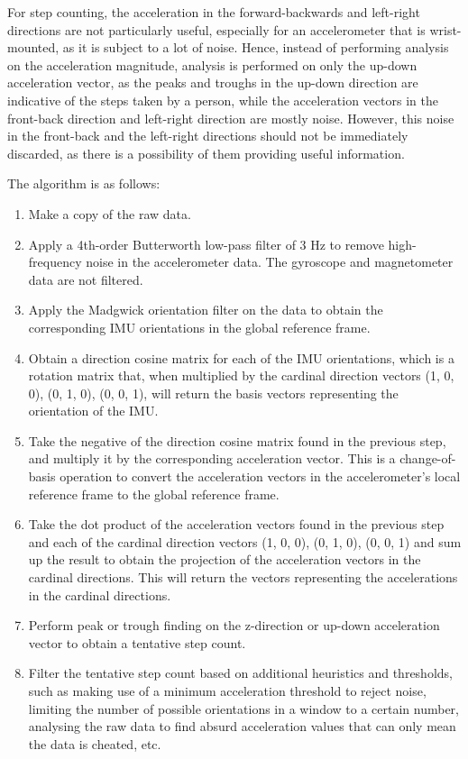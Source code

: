 \documentclass[12pt]{report}
\begin{document}
For step counting, the acceleration in the forward-backwards and left-right
directions are not particularly useful, especially for an accelerometer
that is wrist-mounted, as it is subject to a lot of noise.
Hence, instead of performing analysis on the acceleration
magnitude, analysis is performed on only the up-down acceleration vector,
as the peaks and troughs in the up-down direction are indicative of
the steps taken by a person, while the acceleration vectors in the
front-back direction and left-right direction are mostly noise.
However, this noise in the front-back and the left-right directions
should not be immediately discarded, as there is a possibility
of them providing useful information.

\clearpage

The algorithm is as follows:
\begin{enumerate}
\item Make a copy of the raw data.
\item Apply a 4th-order Butterworth low-pass filter of 3 Hz
to remove high-frequency noise in the accelerometer data.
The gyroscope and magnetometer data are not filtered.
\item Apply the Madgwick orientation filter on the data to obtain
the corresponding IMU orientations in the global reference frame.
\item Obtain a direction cosine matrix for each of the IMU orientations,
which is a rotation matrix that, when multiplied by the cardinal
direction vectors (1, 0, 0), (0, 1, 0), (0, 0, 1), will return
the basis vectors representing the orientation of the IMU.
\item Take the negative of the direction cosine matrix found in the
previous step, and multiply it by the corresponding
acceleration vector. This is a change-of-basis operation to
convert the acceleration vectors in the accelerometer's local
reference frame to the global reference frame.
\item Take the dot product of the acceleration vectors found in the previous
step and each of the cardinal direction vectors
(1, 0, 0), (0, 1, 0), (0, 0, 1) and sum up the result
to obtain the projection of the acceleration vectors
in the cardinal directions. This will return the vectors
representing the accelerations in the cardinal directions.
\item Perform peak or trough finding on the z-direction or
up-down acceleration vector to obtain a tentative step count.
\item Filter the tentative step count based on additional heuristics
and thresholds, such as making use of a minimum acceleration
threshold to reject noise, limiting the number of possible orientations
in a window to a certain number, analysing the raw data to find
absurd acceleration values that can only mean the data is cheated, etc.
\end{enumerate}
\end{document}
